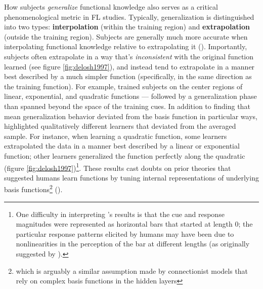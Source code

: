 \documentclass[12pt]{article}
\let\oldcite=\cite
\let\oldtextcite=\textcite
\renewcommand{\cite}[1]{\textcolor[rgb]{0, .121, .388}{\oldcite{#1}}}
\renewcommand{\textcite}[1]{\textcolor[rgb]{0, .121, .388}{\oldtextcite{#1}}}
\begin{document}
How subjects \emph{generalize} functional knowledge also serves as a critical phenomenological metric in FL studies. Typically, generalization is distinguished into two types: \textbf{interpolation} (within the training region) and \textbf{extrapolation} (outside the training region). Subjects are generally much more accurate when interpolating functional knowledge relative to extrapolating it (\cite{delosh1997extrapolation}). Importantly, subjects often extrapolate in a way that's \emph{inconsistent} with the original function learned (see figure \ref{fig:delosh1997}), and instead tend to extrapolate in a manner best described by a much simpler function (specifically, in the same direction as the training function). For example, \textcite{delosh1997extrapolation} trained subjects on the center regions of linear, exponential, and quadratic functions --- followed by a generalization phase than spanned beyond the space of the training cues. In addition to finding that mean generalization behavior deviated from the basis function in particular ways, \textcite{delosh1997extrapolation} highlighted qualitatively different learners that deviated from the averaged sample. For instance, when learning a quadratic function, some learners extrapolated the data in a manner best described by a linear or exponential function; other learners generalized the function perfectly along the quadratic (figure \ref{fig:delosh1997})\footnote{One difficulty in interpreting \textcite{delosh1997extrapolation}'s results is that the cue and response magnitudes were represented as horizontal bars that started at length 0; the particular response patterns elicited by humans may have been due to nonlinearities in the perception of the bar at different lengths (as originally suggested by \textcite{koh1991function}).}. These results cast doubts on prior theories that suggested humans learn functions by tuning internal representations of underlying basis functions\footnote{which is arguably a similar assumption made by connectionist models that rely on complex basis functions in the hidden layers} (\cite{brehmer1974hypotheses,carroll1963functional}).
\end{document}
